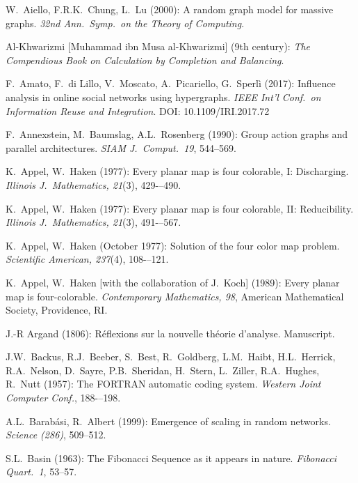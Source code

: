 
\begin{thebibliography}{999}


W.~Aiello, F.R.K.~Chung, L.~Lu (2000):
A random graph model for massive graphs.
{\it 32nd Ann.~Symp.~on the Theory of Computing}.

Al-Khwarizmi [Muhammad ibn Musa al-Khwarizmi] ($9$th century):
{\it The Compendious Book on Calculation by Completion and
  Balancing}.

F.~Amato, F.~di Lillo, V.~Moscato, A.~Picariello, G.~Sperlì (2017):
Influence analysis in online social networks using hypergraphs.
{\it IEEE Int'l Conf.~on Information Reuse and Integration}.
DOI: 10.1109/IRI.2017.72

F.~Annexstein, M.~Baumslag, A.L.~Rosenberg (1990):
Group action graphs and parallel architectures.
{\it SIAM J.~Comput.~19}, 544--569.

K.~Appel, W.~Haken (1977):
Every planar map is four colorable, I: Discharging.
{\it Illinois J.~Mathematics, 21}(3), 429-–490.

K.~Appel, W.~Haken (1977):
Every planar map is four colorable, II: Reducibility.
{\it Illinois J.~Mathematics, 21}(3), 491-–567.

K.~Appel, W.~Haken (October 1977):
Solution of the four color map problem.
{\it Scientific American, 237}(4), 108-–121.

K.~Appel, W.~Haken [with the collaboration of J.~Koch] (1989):
Every planar map is four-colorable.
{\it Contemporary Mathematics, 98},
American Mathematical Society, Providence, RI.

J.-R Argand (1806):
R\'{e}flexions sur la nouvelle th\'{e}orie d'analyse.  Manuscript.


J.W.~Backus, R.J.~Beeber, S.~Best, R.~Goldberg, L.M.~Haibt,
H.L.~Herrick, R.A.~Nelson, D.~Sayre, P.B.~Sheridan, H.~Stern,
L.~Ziller, R.A.~Hughes, R.~Nutt (1957):
The FORTRAN automatic coding system.  {\it Western Joint Computer
Conf.}, 188-–198.

A.L.~Barab\'{a}si, R.~Albert (1999):
Emergence of scaling in random networks.
{\it Science (286)}, 509--512.

S.L.~Basin (1963): The Fibonacci Sequence as it appears in nature.
{\it Fibonacci Quart.~1}, 53--57.


\end{thebibliography}
